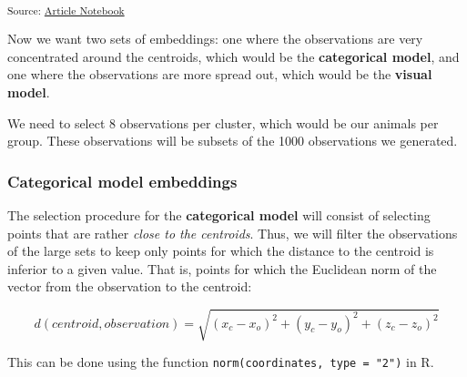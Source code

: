 \documentclass[
  authoryear]{elsarticle}
\begin{document}
\textsubscript{Source:
\href{https://m-delem.github.io/2499-similarity-manuscript/index.qmd.html}{Article
Notebook}}

Now we want two sets of embeddings: one where the observations are very
concentrated around the centroids, which would be the
\textbf{categorical model}, and one where the observations are more
spread out, which would be the \textbf{visual model}.

We need to select 8 observations per cluster, which would be our animals
per group. These observations will be subsets of the 1000 observations
we generated.

\subsubsection{Categorical model
embeddings}\label{categorical-model-embeddings}

The selection procedure for the \textbf{categorical model} will consist
of selecting points that are rather \emph{close to the centroids}. Thus,
we will filter the observations of the large sets to keep only points
for which the distance to the centroid is inferior to a given value.
That is, points for which the Euclidean norm of the vector from the
observation to the centroid:

\[d(centroid, observation) = \sqrt{(x_{c} - x_{o})^{2} + (y_{c} - y_{o})^{2} + (z_{c} - z_{o})^{2}}\]

This can be done using the function
\texttt{norm(coordinates,\ type\ =\ "2")} in R.
\end{document}
